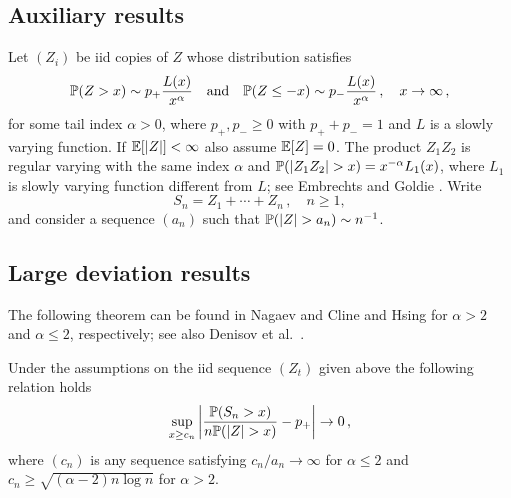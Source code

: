 \ifx\phdthesis\undefined
\appendix
\else
\begin{subappendices}
\fi


\section{Auxiliary results}\label{appendix:A}

Let $(Z_i)$ be iid copies of $Z$ whose distribution satisfies
\begin{equation*}
\mathbb{P}(Z>x)\sim p_+ \dfrac{L(x)}{x^{\alpha}}\quad\mbox{and}\quad  \mathbb{P}(Z\le -x)\sim p_-
\dfrac{L(x)}{x^{\alpha}} \,,\quad x \to \infty\,,
\end{equation*}
 for some tail index $\alpha>0$,
where $p_+,p_-\ge 0$ with $p_++p_-=1$ and $L$ is a slowly varying function. If $\mathbb{E}[|Z|]<\infty$ also assume $\mathbb{E}[Z]=0$. The product $Z_1Z_2$ is regular varying with the same index $\alpha$ and $\P(|Z_1Z_2|>x)= x^{-\alpha} L_1(x)$, where $L_1$ is slowly varying function different from $L$;
see Embrechts and Goldie \cite{embrechts:goldie:1980}.
Write
\begin{equation*}
S_n=Z_1+\cdots +Z_n\,,\quad n\ge 1,
\end{equation*} and consider a sequence $(a_n)$ such that $\P(|Z|>a_n)\sim n^{-1}$.

\subsection{Large deviation results}
The following theorem can be found in
Nagaev \cite{nagaev:1979} and Cline and Hsing
\cite{cline:hsing:1998} for $\alpha>2$ and $\alpha\le 2$,
respectively; see also  Denisov et al.~\cite{denisov:dieker:shneer:2008}.
\begin{theorem}\label{thm:nagaev}
Under the assumptions on the iid sequence $(Z_t)$
given above the following relation holds
\begin{equation*}
\sup_{x\ge c_n}\left|\dfrac{\P(S_n>x )}{n\P(|Z|>x)} -p_+ \right|\to 0\,,
\end{equation*}
where $(c_n)$ is any sequence satisfying $c_n/a_n\to  \infty$ for
$\alpha\le 2$ and $c_n\ge \sqrt{(\alpha-2)n\log n}$ for $\alpha>2$.
\end{theorem}





\end{subappendices}
